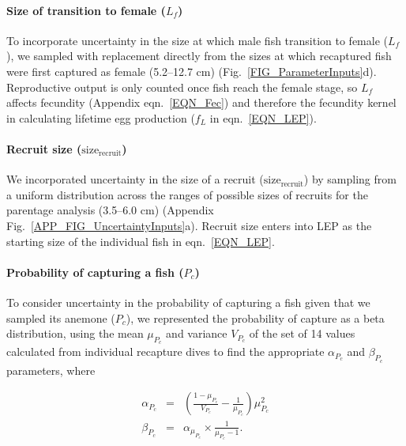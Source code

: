 \documentclass[12pt, oneside]{article}   	%
\begin{document}
\paragraph*{Size of transition to female ($L_f$)} %

To incorporate uncertainty in the size at which male fish transition to female ($L_f$), we sampled with replacement directly from the sizes at which recaptured fish were first captured as female (5.2--12.7 cm) (Fig.\ \ref{FIG_ParameterInputs}d). Reproductive output is only counted once fish reach the female stage, so $L_f$ affects fecundity (Appendix eqn.\ \ref{EQN_Fec}) and therefore the fecundity kernel in calculating lifetime egg production ($f_L$ in eqn.\ \ref{EQN_LEP}).

\paragraph*{Recruit size ($\text{size}_\text{recruit}$)} %

We incorporated uncertainty in the size of a recruit ($\text{size}_\text{recruit}$) by sampling from a uniform distribution across the ranges of possible sizes of recruits for the parentage analysis (3.5--6.0 cm) (Appendix Fig.\ \ref{APP_FIG_UncertaintyInputs}a). Recruit size enters into LEP as the starting size of the individual fish in eqn.\ \ref{EQN_LEP}.

\paragraph*{Probability of capturing a fish ($P_c$)} %

To consider uncertainty in the probability of capturing a fish given that we sampled its anemone ($P_c$), we represented the probability of capture as a beta distribution, using the mean $\mu_{P_c}$ and variance $V_{P_c}$ of the set of 14 values calculated from individual recapture dives to find the appropriate $\alpha_{P_c}$ and $\beta_{P_c}$ parameters, where 

\begin{eqnarray}
\alpha_{P_c} &=& (\frac{1-\mu_{P_c}}{V_{P_c}} - \frac{1}{\mu_{P_c}}) \mu_{P_c}^2 \\
\beta_{P_c} &=& \alpha_{\mu_{P_c}} \times \frac{1}{\mu_{P_c} - 1}. \label{APP_EQN_ProbCapBetaDistParams}  %
\end{eqnarray}
\end{document}
